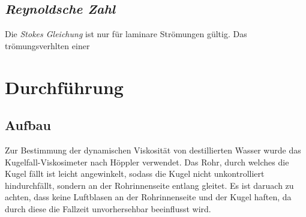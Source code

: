 \subsection{\emph{Reynoldsche Zahl}}

Die \emph{Stokes Gleichung} ist nur für laminare Strömungen gültig. Das trömungsverhlten einer

\section{Durchführung}

\subsection{Aufbau}

Zur Bestimmung der dynamischen Viskosität von destillierten Wasser wurde das Kugelfall-Viskosimeter nach Höppler verwendet.
Das Rohr, durch welches die Kugel fällt ist leicht angewinkelt, sodass die Kugel nicht unkontrolliert hindurchfällt, sondern an der Rohrinnenseite
entlang gleitet. Es ist daruach zu achten, dass keine Luftblasen an der Rohrinnenseite und der Kugel haften, da durch diese die
Fallzeit unvorhersehbar beeinflusst wird.


